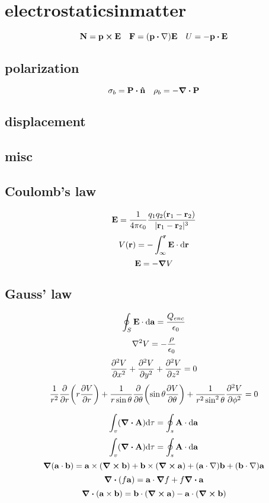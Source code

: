 \section*{electrostaticsinmatter}
\[\vb{N}=\vb{p}\cp\vb{E}\quad\vb{F}=\qty(\vb{p}\vdot\nabla)\vb{E}\quad U=-\vb{p}\vdot\vb{E}\]
\subsection*{polarization}
\[\sigma_b=\vb{P}\vdot\vu{n}\quad\rho_b=-\div{\vb{P}}\]
\subsection*{displacement}
\subsection*{misc}

\subsection*{Coulomb's law}
\[\vb{E}=\frac{1}{4\pi\epsilon_0}\frac{q_1q_2(\vb{r}_1-\vb{r}_2)}{|\vb{r}_1-\vb{r}_2|^3}\]
\[V(\vb{r})=-\int_\infty^{\vb{r}}\vb{E}\cdot\dd\vb{r}\]
\[\vb{E}=-\grad{V}\]

\subsection*{Gauss' law}
\[\oint_S{\vb{E}\cdot\dd{\vb{a}}}=\frac{Q_{enc}}{\epsilon_0}\]
\[\laplacian{V}=-\frac{\rho}{\epsilon_0}\]
\[\pdv[2]{V}{x}+\pdv[2]{V}{y}+\pdv[2]{V}{z}=0\]
\[\frac{1}{r^2}\pdv{r}\qty(r\pdv{V}{r})+\frac{1}{r\sin\theta}\pdv{\theta}\qty(\sin\theta\pdv{V}{\theta})+\frac{1}{r^2\sin^2\theta}\pdv[2]{V}{\phi}=0\]

\[\int_{v}(\div{\vb{A}})\dd\tau=\oint_{s}\vb{A}\cdot\dd{\vb{a}}\]
\[\int_{v}(\div{\vb{A}})\dd\tau=\oint_{s}\vb{A}\cdot\dd{\vb{a}}\]
\[\grad{(\vb{a}\cdot\vb{b})}=\vb{a}\times(\curl{\vb{b}})+\vb{b}\times(\curl{\vb{a}})+(\vb{a}\cdot\nabla)\vb{b}+(\vb{b}\cdot\nabla)\vb{a}\]
\[\div{(f\vb{a})}=\vb{a}\cdot\grad{f}+f\div{\vb{a}}\]
\[\div{(\vb{a}\times\vb{b})}=\vb{b}\cdot(\curl{\vb{a}})-\vb{a}\cdot(\curl{\vb{b}})\]
